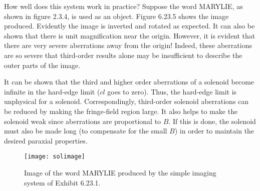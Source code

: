 \clearpage

How well does this system work in practice?  Suppose the word MARYLIE, as
shown in figure 2.3.4, is used as an object.  Figure 6.23.5 shows the image produced.  Evidently the image is inverted and rotated as expected.  It can also be shown that there is unit magnification near the origin.  However, it is evident that there are very severe aberrations  away from the origin!  Indeed, these aberrations are so severe that third-order results alone may be insufficient to describe the outer parts of the image.

It can be shown that the third and higher order aberrations of a solenoid
become infinite in the hard-edge limit ($cl$ goes to zero).  Thus, the hard-edge limit is unphysical for a solenoid.  Correspondingly, third-order solenoid aberrations can be reduced by making the fringe-field region large.  It also helps to make the solenoid weak since aberrations are proportional to $B$.  If this is done, the solenoid must also be made long (to compensate for the small $B$) in order to maintain the desired paraxial properties.

\begin{figure}[hp]
  \centering
  \texttt{[image: solimage]}
  \caption{Image of the word MARYLIE produced by the simple imaging system of Exhibit 6.23.1.}
\end{figure}

\clearpage




